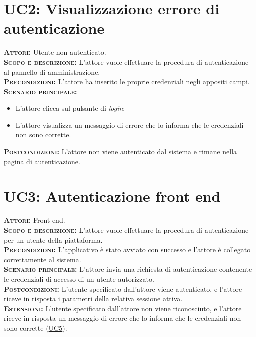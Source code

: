 \section{UC2: Visualizzazione errore di autenticazione}
\label{sec:uc2}
\textsc{\textbf{Attori:}} Utente non autenticato.\\
\textsc{\textbf{Scopo e descrizione:}} L'attore vuole effettuare la procedura di autenticazione al pannello di amministrazione.\\
\textsc{\textsc{\textbf{Precondizioni:}}} L'attore ha inserito le proprie credenziali negli appositi campi.\\
\textsc{\textbf{Scenario principale:}}
\begin{itemize}
    \item L'attore clicca sul pulsante di \textit{login};
    \item L'attore visualizza un messaggio di errore che lo informa che le credenziali non sono corrette.
\end{itemize}
\textsc{\textbf{Postcondizioni:}} L'attore non viene autenticato dal sistema e rimane nella pagina di autenticazione.

\section{UC3: Autenticazione front end}
\label{sec:uc3}
\textsc{\textbf{Attori:}} Front end.\\
\textsc{\textbf{Scopo e descrizione:}} L'attore vuole effettuare la procedura di autenticazione per un utente della piattaforma.\\
\textsc{\textsc{\textbf{Precondizioni:}}} L'applicativo è stato avviato con successo e l'attore è collegato correttamente al sistema.\\
\textsc{\textbf{Scenario principale:}} L'attore invia una richiesta di autenticazione contenente le credenziali di accesso di un utente autorizzato.\\
\textsc{\textbf{Postcondizioni:}} L'utente specificato dall'attore viene autenticato, e l'attore riceve in risposta i parametri della relativa sessione attiva.\\
\textsc{\textbf{Estensioni:}}  L'utente specificato dall'attore non viene riconosciuto, e l'attore riceve in risposta un messaggio di errore che lo informa che le credenziali non sono corrette (\hyperref[sec:UC5]{UC5}).

